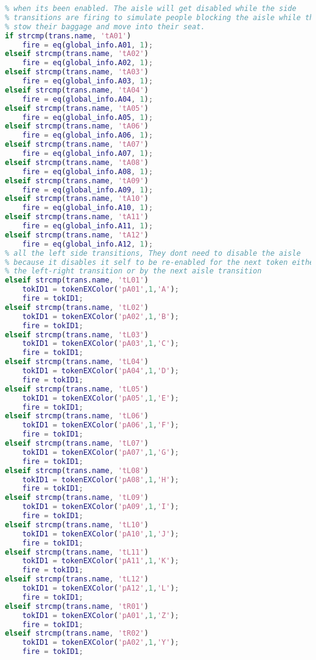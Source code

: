 \begin{lstlisting}[language=MATLAB, caption=COMMON\_PRE.m]
% first we handle the aisle, the logic here is that the aisle can only fire
% when its been enabled. The aisle will get disabled while the side
% transitions are firing to simulate people blocking the aisle while they
% stow their baggage and move into their seat.
if strcmp(trans.name, 'tA01')
    fire = eq(global_info.A01, 1);
elseif strcmp(trans.name, 'tA02')
    fire = eq(global_info.A02, 1);
elseif strcmp(trans.name, 'tA03')
    fire = eq(global_info.A03, 1);
elseif strcmp(trans.name, 'tA04')
    fire = eq(global_info.A04, 1);
elseif strcmp(trans.name, 'tA05')
    fire = eq(global_info.A05, 1);
elseif strcmp(trans.name, 'tA06')
    fire = eq(global_info.A06, 1);
elseif strcmp(trans.name, 'tA07')
    fire = eq(global_info.A07, 1);
elseif strcmp(trans.name, 'tA08')
    fire = eq(global_info.A08, 1);
elseif strcmp(trans.name, 'tA09')
    fire = eq(global_info.A09, 1);
elseif strcmp(trans.name, 'tA10')
    fire = eq(global_info.A10, 1);
elseif strcmp(trans.name, 'tA11')
    fire = eq(global_info.A11, 1);
elseif strcmp(trans.name, 'tA12')
    fire = eq(global_info.A12, 1);
% all the left side transitions, They dont need to disable the aisle
% because it disables it self to be re-enabled for the next token either by
% the left-right transition or by the next aisle transition
elseif strcmp(trans.name, 'tL01')
    tokID1 = tokenEXColor('pA01',1,'A');
    fire = tokID1;
elseif strcmp(trans.name, 'tL02')
    tokID1 = tokenEXColor('pA02',1,'B');
    fire = tokID1;
elseif strcmp(trans.name, 'tL03')
    tokID1 = tokenEXColor('pA03',1,'C');
    fire = tokID1;
elseif strcmp(trans.name, 'tL04')
    tokID1 = tokenEXColor('pA04',1,'D');
    fire = tokID1;
elseif strcmp(trans.name, 'tL05')
    tokID1 = tokenEXColor('pA05',1,'E');
    fire = tokID1;
elseif strcmp(trans.name, 'tL06')
    tokID1 = tokenEXColor('pA06',1,'F');
    fire = tokID1;
elseif strcmp(trans.name, 'tL07')
    tokID1 = tokenEXColor('pA07',1,'G');
    fire = tokID1;
elseif strcmp(trans.name, 'tL08')
    tokID1 = tokenEXColor('pA08',1,'H');
    fire = tokID1;
elseif strcmp(trans.name, 'tL09')
    tokID1 = tokenEXColor('pA09',1,'I');
    fire = tokID1;
elseif strcmp(trans.name, 'tL10')
    tokID1 = tokenEXColor('pA10',1,'J');
    fire = tokID1;
elseif strcmp(trans.name, 'tL11')
    tokID1 = tokenEXColor('pA11',1,'K');
    fire = tokID1;
elseif strcmp(trans.name, 'tL12')
    tokID1 = tokenEXColor('pA12',1,'L');
    fire = tokID1;
elseif strcmp(trans.name, 'tR01')
    tokID1 = tokenEXColor('pA01',1,'Z');
    fire = tokID1;
elseif strcmp(trans.name, 'tR02')
    tokID1 = tokenEXColor('pA02',1,'Y');
    fire = tokID1;

\end{lstlisting}
